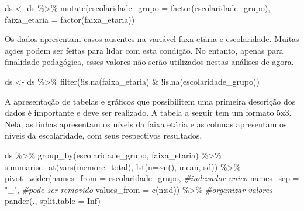 \documentclass[
]{book}
\newenvironment{Shaded}{\begin{snugshade}}{\end{snugshade}}
\newcommand{\AttributeTok}[1]{\textcolor[rgb]{0.77,0.63,0.00}{#1}}
\newcommand{\CommentTok}[1]{\textcolor[rgb]{0.56,0.35,0.01}{\textit{#1}}}
\newcommand{\ConstantTok}[1]{\textcolor[rgb]{0.00,0.00,0.00}{#1}}
\newcommand{\FunctionTok}[1]{\textcolor[rgb]{0.00,0.00,0.00}{#1}}
\newcommand{\NormalTok}[1]{#1}
\newcommand{\OtherTok}[1]{\textcolor[rgb]{0.56,0.35,0.01}{#1}}
\newcommand{\SpecialCharTok}[1]{\textcolor[rgb]{0.00,0.00,0.00}{#1}}
\newcommand{\StringTok}[1]{\textcolor[rgb]{0.31,0.60,0.02}{#1}}
\begin{document}
\begin{Shaded}
\begin{Highlighting}[]
\NormalTok{ds }\OtherTok{\textless{}{-}}\NormalTok{ ds }\SpecialCharTok{\%\textgreater{}\%} 
  \FunctionTok{mutate}\NormalTok{(}\AttributeTok{escolaridade\_grupo =} \FunctionTok{factor}\NormalTok{(escolaridade\_grupo),}
         \AttributeTok{faixa\_etaria =} \FunctionTok{factor}\NormalTok{(faixa\_etaria))}
\end{Highlighting}
\end{Shaded}

Os dados apresentam casos ausentes na variável faxa etária e escolaridade. Muitas ações podem ser feitas para lidar com esta condição. No entanto, apenas para finalidade pedagógica, esses valores não serão utilizados nestas análises de agora.

\begin{Shaded}
\begin{Highlighting}[]
\NormalTok{ds }\OtherTok{\textless{}{-}}\NormalTok{ ds }\SpecialCharTok{\%\textgreater{}\%} 
  \FunctionTok{filter}\NormalTok{(}\SpecialCharTok{!}\FunctionTok{is.na}\NormalTok{(faixa\_etaria) }\SpecialCharTok{\&} \SpecialCharTok{!}\FunctionTok{is.na}\NormalTok{(escolaridade\_grupo))}
\end{Highlighting}
\end{Shaded}

A apresentação de tabelas e gráficos que possibilitem uma primeira descrição dos dados é importante e deve ser realizado. A tabela a seguir tem um formato 5x3. Nela, as linhas apresentam os níveis da faixa etária e as colunas apresentam os níveis da escolaridade, com seus respectivos resultados.

\begin{Shaded}
\begin{Highlighting}[]
\NormalTok{ds }\SpecialCharTok{\%\textgreater{}\%} 
  \FunctionTok{group\_by}\NormalTok{(escolaridade\_grupo, faixa\_etaria) }\SpecialCharTok{\%\textgreater{}\%} 
  \FunctionTok{summarise\_at}\NormalTok{(}\FunctionTok{vars}\NormalTok{(memore\_total), }\FunctionTok{lst}\NormalTok{(}\AttributeTok{n=}\SpecialCharTok{\textasciitilde{}}\FunctionTok{n}\NormalTok{(), mean, sd)) }\SpecialCharTok{\%\textgreater{}\%}  
  \FunctionTok{pivot\_wider}\NormalTok{(}\AttributeTok{names\_from =}\NormalTok{ escolaridade\_grupo, }\CommentTok{\#indexador unico}
              \AttributeTok{names\_sep =} \StringTok{"\_"}\NormalTok{,  }\CommentTok{\#pode ser removido}
              \AttributeTok{values\_from =} \FunctionTok{c}\NormalTok{(n}\SpecialCharTok{:}\NormalTok{sd)) }\SpecialCharTok{\%\textgreater{}\%}  \CommentTok{\#organizar valores}
  \FunctionTok{pander}\NormalTok{(., }\AttributeTok{split.table =} \ConstantTok{Inf}\NormalTok{)}
\end{Highlighting}
\end{Shaded}
\end{document}
